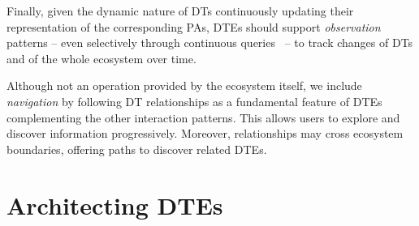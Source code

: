 Finally, given the dynamic nature of \acp{DT} continuously updating their representation of the corresponding \acp{PA}, \acp{DTE} should support \emph{observation} patterns -- even selectively through continuous queries~\cite{babu2001sigmod} -- to track changes of \acp{DT} and of the whole ecosystem over time.

Although not an operation provided by the ecosystem itself, we include \emph{navigation} by following \ac{DT} relationships as a fundamental feature of \acp{DTE} complementing the other interaction patterns.
%
This allows users to explore and discover information progressively.
Moreover, relationships may cross ecosystem boundaries, offering paths to discover related \acp{DTE}.

\section{Architecting \aclp{DTE}}
\label{sec:architecting-dte}

